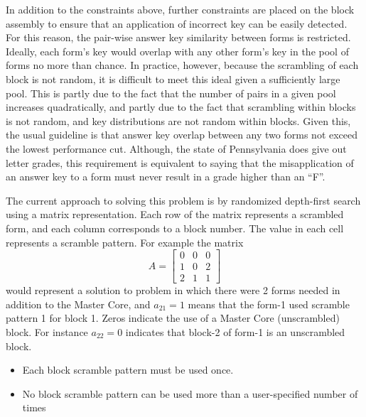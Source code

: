 \documentclass[11pt]{article}
\begin{document}
\par
In addition to the constraints above, further constraints are placed
on the block assembly to ensure that an application of incorrect key
can be easily detected. For this reason, the pair-wise answer key
similarity between forms is restricted. Ideally, each form's key would
overlap with any other form's key in the pool of forms no more than
chance.  In practice, however, because the scrambling of each block is
not random, it is difficult to meet this ideal given a sufficiently
large pool. This is partly due to the fact that the number of pairs in
a given pool increases quadratically, and partly due to the fact that
scrambling within blocks is not random, and key distributions are not
random within blocks.  Given this, the usual guideline is that answer
key overlap between any two forms not exceed the lowest performance
cut.  Although, the state of Pennsylvania does give out letter grades,
this requirement is equivalent to saying that the misapplication of an
answer key to a form must never result in a grade higher than an
``F''.
\par
The current approach to solving this problem is by randomized
depth-first search using a matrix representation.  Each row of the
matrix represents a scrambled form, and each column corresponds to a
block number.  The value in each cell represents a scramble pattern.
For example the matrix
\[
A =
\begin{bmatrix}
  0 & 0 & 0 \\
  1 & 0 & 2 \\
  2 & 1 & 1
\end{bmatrix}
\]
would represent a solution to problem in which there were 2 forms
needed in addition to the Master Core, and \(a_{21}=1\)
means that the form-1 used scramble pattern 1 for block 1. Zeros
indicate the use of a Master Core (unscrambled) block.  For instance
\(a_{22} = 0\)
indicates that block-2 of form-1 is an unscrambled block.
\begin{itemize}
\item Each block scramble pattern must be used once.
\item No block scramble pattern can be used more than a user-specified
  number of times
\end{itemize}
\end{document}
